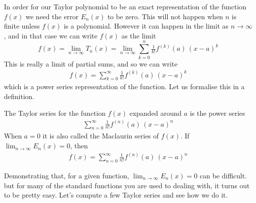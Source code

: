 In order for our Taylor polynomial to be an exact representation of
the function $f(x)$ we need the error $E_n(x)$ to be zero.
This will not happen when $n$ is finite unless $f(x)$ is a
polynomial. However it can happen in the limit as $n \to \infty$,
and in that case we can write $f(x)$ as the limit
\begin{equation*}
f(x)=\lim_{n\rightarrow\infty} T_n(x)
=\lim_{n\rightarrow\infty} \sum_{k=0}^n \tfrac{1}{k!}f^{(k)}(a)\, (x-a)^k
\end{equation*}
This is really a limit of partial sums, and so we can write
\begin{align*}
f(x)=\sum_{k=0}^\infty \tfrac{1}{k!}f^{(k)}(a)\, (x-a)^k
\end{align*}
which is a power series representation of the function. Let us
formalise this in a definition.
\begin{defn}\label{defn:taylorSeries}
The Taylor series for the function $f(x)$ expanded around $a$
is the power series
\begin{align*}
\sum_{n=0}^\infty \tfrac{1}{n!}f^{(n)}(a)\, (x-a)^n
\end{align*}
When $a=0$ it is also called the Maclaurin series of $f(x)$. If 
$\lim_{n\rightarrow\infty}E_n(x)=0$, then
\begin{align*}
f(x)=\sum_{n=0}^\infty \tfrac{1}{n!}f^{(n)}(a)\, (x-a)^n
\end{align*}
\end{defn}
\noindent
Demonstrating that, for a given function, $\lim_{n\rightarrow\infty}E_n(x)=0$
can be difficult.
but for many of the standard functions you are used to dealing with, 
it turns out to be pretty easy. Let's compute a few Taylor series and see 
how we do it.



